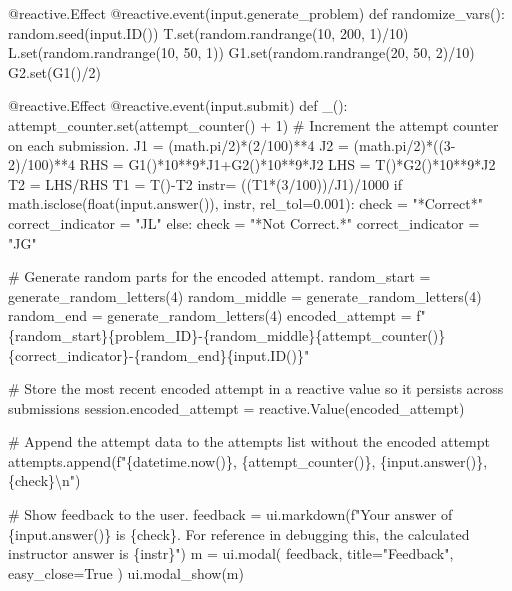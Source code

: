 \documentclass[
  letterpaper,
  DIV=11,
  numbers=noendperiod]{scrreprt}
\newenvironment{Shaded}{\begin{snugshade}}{\end{snugshade}}
\newcommand{\NormalTok}[1]{\textcolor[rgb]{0.00,0.23,0.31}{#1}}
\begin{document}
\begin{Shaded}
\begin{Highlighting}[]
\NormalTok{    @reactive.Effect}
\NormalTok{    @reactive.event(input.generate\_problem)}
\NormalTok{    def randomize\_vars():}
\NormalTok{        random.seed(input.ID())}
\NormalTok{        T.set(random.randrange(10, 200, 1)/10)}
\NormalTok{        L.set(random.randrange(10, 50, 1))}
\NormalTok{        G1.set(random.randrange(20, 50, 2)/10)}
\NormalTok{        G2.set(G1()/2)}
        
        
\NormalTok{    @reactive.Effect}
\NormalTok{    @reactive.event(input.submit)}
\NormalTok{    def \_():}
\NormalTok{        attempt\_counter.set(attempt\_counter() + 1)  \# Increment the attempt counter on each submission.}
\NormalTok{        J1 = (math.pi/2)*(2/100)**4}
\NormalTok{        J2 = (math.pi/2)*((3{-}2)/100)**4}
\NormalTok{        RHS = G1()*10**9*J1+G2()*10**9*J2}
\NormalTok{        LHS = T()*G2()*10**9*J2}
\NormalTok{        T2 = LHS/RHS}
\NormalTok{        T1 = T(){-}T2}
\NormalTok{        instr= ((T1*(3/100))/J1)/1000}
\NormalTok{        if math.isclose(float(input.answer()), instr, rel\_tol=0.001):}
\NormalTok{            check = "*Correct*"}
\NormalTok{            correct\_indicator = "JL"}
\NormalTok{        else:}
\NormalTok{            check = "*Not Correct.*"}
\NormalTok{            correct\_indicator = "JG"}

\NormalTok{        \# Generate random parts for the encoded attempt.}
\NormalTok{        random\_start = generate\_random\_letters(4)}
\NormalTok{        random\_middle = generate\_random\_letters(4)}
\NormalTok{        random\_end = generate\_random\_letters(4)}
\NormalTok{        encoded\_attempt = f"\{random\_start\}\{problem\_ID\}{-}\{random\_middle\}\{attempt\_counter()\}\{correct\_indicator\}{-}\{random\_end\}\{input.ID()\}"}

\NormalTok{        \# Store the most recent encoded attempt in a reactive value so it persists across submissions}
\NormalTok{        session.encoded\_attempt = reactive.Value(encoded\_attempt)}

\NormalTok{        \# Append the attempt data to the attempts list without the encoded attempt}
\NormalTok{        attempts.append(f"\{datetime.now()\}, \{attempt\_counter()\}, \{input.answer()\}, \{check\}\textbackslash{}n")}

\NormalTok{        \# Show feedback to the user.}
\NormalTok{        feedback = ui.markdown(f"Your answer of \{input.answer()\} is \{check\}. For reference in debugging this, the calculated instructor answer is \{instr\}")}
\NormalTok{        m = ui.modal(}
\NormalTok{            feedback,}
\NormalTok{            title="Feedback",}
\NormalTok{            easy\_close=True}
\NormalTok{        )}
\NormalTok{        ui.modal\_show(m)}


\end{Highlighting}
\end{Shaded}
\end{document}
